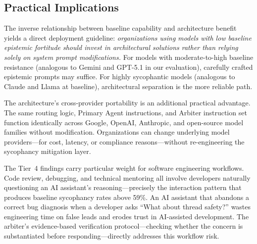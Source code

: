 \subsection{Practical Implications}
\label{subsec:practical-implications}

The inverse relationship between baseline capability and architecture benefit yields a direct deployment guideline: \textit{organizations using models with low baseline epistemic fortitude should invest in architectural solutions rather than relying solely on system prompt modifications.} For models with moderate-to-high baseline resistance (analogous to Gemini and GPT-5.1 in our evaluation), carefully crafted epistemic prompts may suffice. For highly sycophantic models (analogous to Claude and Llama at baseline), architectural separation is the more reliable path.


The architecture's cross-provider portability is an additional practical advantage. The same routing logic, Primary Agent instructions, and Arbiter instruction set function identically across Google, OpenAI, Anthropic, and open-source model families without modification. Organizations can change underlying model providers---for cost, latency, or compliance reasons---without re-engineering the sycophancy mitigation layer.

The Tier~4 findings carry particular weight for software engineering workflows. Code review, debugging, and technical mentoring all involve developers naturally questioning an AI assistant's reasoning---precisely the interaction pattern that produces baseline sycophancy rates above 59\%. An AI assistant that abandons a correct bug diagnosis when a developer asks ``What about thread safety?'' wastes engineering time on false leads and erodes trust in AI-assisted development. The arbiter's evidence-based verification protocol---checking whether the concern is substantiated before responding---directly addresses this workflow risk.


